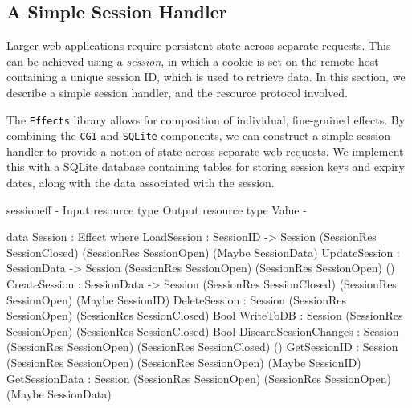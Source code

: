 \subsection{A Simple Session Handler}
Larger web applications require persistent state across separate
requests. This can be achieved using a \textit{session},
in which a cookie is set on the remote host containing a unique session ID,
which is used to retrieve data. In this section, we describe
a simple session handler, and the resource protocol
involved. 

The \texttt{Effects} library allows for composition of individual, fine-grained
effects. By combining the \texttt{CGI} and \texttt{SQLite} components, we can
construct a simple session handler to provide a notion of state across separate
web requests. 
We implement this with a SQLite database containing tables for storing
session keys and expiry dates, along with the data associated with
the session.


\begin{SaveVerbatim}{sessioneff}
{-                        { Input resource type }            { Output resource type }   { Value }        -}

data Session : Effect where
  LoadSession           : SessionID -> 
                          Session (SessionRes SessionClosed) (SessionRes SessionOpen)   (Maybe SessionData)
  UpdateSession         : SessionData -> 
                          Session (SessionRes SessionOpen)   (SessionRes SessionOpen)   ()
  CreateSession         : SessionData -> 
                          Session (SessionRes SessionClosed) (SessionRes SessionOpen)   (Maybe SessionID)
  DeleteSession         : Session (SessionRes SessionOpen)   (SessionRes SessionClosed) Bool 
  WriteToDB             : Session (SessionRes SessionOpen)   (SessionRes SessionClosed) Bool
  DiscardSessionChanges : Session (SessionRes SessionOpen)   (SessionRes SessionClosed) ()
  GetSessionID          : Session (SessionRes SessionOpen)   (SessionRes SessionOpen)   (Maybe SessionID)
  GetSessionData        : Session (SessionRes SessionOpen)   (SessionRes SessionOpen)   (Maybe SessionData)
\end{SaveVerbatim}

